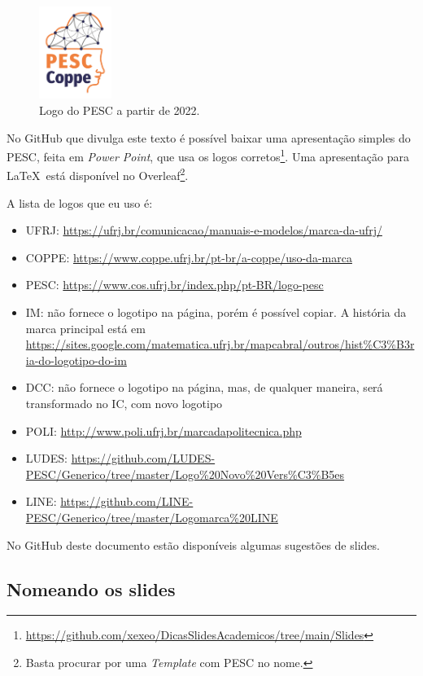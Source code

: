\begin{figure}[hbt]
    \centering
    \includegraphics[height=3cm]{imagens/logoPESC_sigla_cor}
    \caption{Logo do PESC a partir de 2022.}
    \label{fig:logopesc}
\end{figure}



No GitHub que divulga este texto é possível baixar uma apresentação simples do PESC, feita em \textit{Power Point}, que usa os logos corretos\footnote{\url{https://github.com/xexeo/DicasSlidesAcademicos/tree/main/Slides}}. Uma apresentação para \LaTeX\  está disponível no Overleaf\footnote{Basta procurar por uma \textit{Template} com PESC no nome.}.



A lista de logos que eu uso é:
\begin{itemize}
    \item UFRJ: \url{https://ufrj.br/comunicacao/manuais-e-modelos/marca-da-ufrj/}
    \item COPPE: \url{https://www.coppe.ufrj.br/pt-br/a-coppe/uso-da-marca}
    \item PESC:  \url{https://www.cos.ufrj.br/index.php/pt-BR/logo-pesc}
    \item IM: não fornece o logotipo na página, porém é possível copiar. A história da marca principal está em \url{https://sites.google.com/matematica.ufrj.br/mapcabral/outros/hist%C3%B3ria-do-logotipo-do-im}
    \item DCC: não fornece o logotipo na página, mas, de qualquer maneira, será transformado no IC, com novo logotipo
    \item POLI: \url{http://www.poli.ufrj.br/marcadapolitecnica.php}
    \item LUDES: \url{https://github.com/LUDES-PESC/Generico/tree/master/Logo%20Novo%20Vers%C3%B5es}
    \item LINE: \url{https://github.com/LINE-PESC/Generico/tree/master/Logomarca%20LINE}
\end{itemize}

No GitHub deste documento estão disponíveis algumas sugestões de slides.


\subsection{Nomeando os slides}

